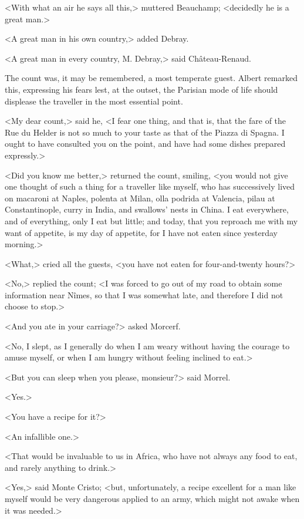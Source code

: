  <With what an air he says all this,> muttered Beauchamp; <decidedly he is a great man.> 

 <A great man in his own country,> added Debray. 

 <A great man in every country, M. Debray,> said Château-Renaud. 

 The count was, it may be remembered, a most temperate guest. Albert remarked this, expressing his fears lest, at the outset, the Parisian mode of life should displease the traveller in the most essential point. 

 <My dear count,> said he, <I fear one thing, and that is, that the fare of the Rue du Helder is not so much to your taste as that of the Piazza di Spagna. I ought to have consulted you on the point, and have had some dishes prepared expressly.> 

 <Did you know me better,> returned the count, smiling, <you would not give one thought of such a thing for a traveller like myself, who has successively lived on macaroni at Naples, polenta at Milan, olla podrida at Valencia, pilau at Constantinople, curry in India, and swallows' nests in China. I eat everywhere, and of everything, only I eat but little; and today, that you reproach me with my want of appetite, is my day of appetite, for I have not eaten since yesterday morning.> 

 <What,> cried all the guests, <you have not eaten for four-and-twenty hours?> 

 <No,> replied the count; <I was forced to go out of my road to obtain some information near Nîmes, so that I was somewhat late, and therefore I did not choose to stop.> 

 <And you ate in your carriage?> asked Morcerf. 

 <No, I slept, as I generally do when I am weary without having the courage to amuse myself, or when I am hungry without feeling inclined to eat.> 

 <But you can sleep when you please, monsieur?> said Morrel. 

 <Yes.> 

 <You have a recipe for it?> 

 <An infallible one.> 

 <That would be invaluable to us in Africa, who have not always any food to eat, and rarely anything to drink.> 

 <Yes,> said Monte Cristo; <but, unfortunately, a recipe excellent for a man like myself would be very dangerous applied to an army, which might not awake when it was needed.> 

